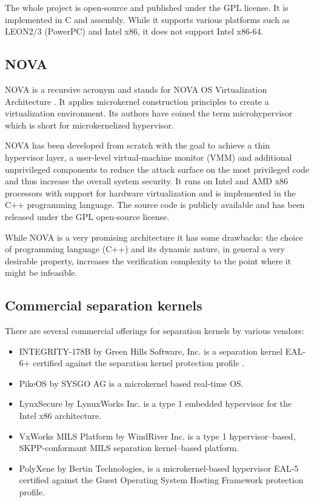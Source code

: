 The whole project is open-source and published under the GPL license. It is
implemented in C and assembly. While it supports various platforms such as
LEON2/3 (PowerPC) and Intel x86, it does not support Intel x86-64.

\subsection{NOVA}
NOVA is a recursive acronym and stands for NOVA OS Virtualization Architecture
\cite{Steinberg:2010:NMS:1755913.1755935}. It applies microkernel construction
principles to create a virtualization environment. Its authors have coined
the term microhypervisor which is short for
microkernelized hypervisor.

NOVA has been developed from scratch with the goal to achieve a thin hypervisor
layer, a user-level virtual-machine monitor (VMM) and additional unprivileged
components to reduce the attack surface on the most privileged code and thus
increase the overall system security. It runs on Intel and AMD x86 processors
with support for hardware virtualization and is implemented in the C++
programming language. The source code is publicly available \cite{NOVA} and has
been released under the GPL open-source license.

While NOVA is a very promising architecture it has some drawbacks: the choice of
programming language (C++) and its dynamic nature, in general a very desirable
property, increases the verification complexity to the point where it might be
infeasible.

\subsection{Commercial separation kernels}\label{subsec:commercial-sks}
There are several commercial offerings for separation kernels by various
vendors:

\begin{itemize}
	\item INTEGRITY-178B by Green Hills Software, Inc. is a separation kernel
		EAL-6+ certified against the separation kernel protection profile
		\cite{SKPP}.
	\item PikeOS by SYSGO AG is a microkernel based real-time OS.
	\item LynxSecure by LynuxWorks Inc. is a type 1 embedded hypervisor for the
		Intel x86 architecture.
	\item VxWorks MILS Platform by WindRiver Inc. is a type 1 hypervisor–based,
		SKPP-conformant MILS separation kernel–based platform.
	\item PolyXene by Bertin Technologies, is a microkernel-based hypervisor
		EAL-5 certified against the Guest Operating System Hosting Framework
		protection profile.
\end{itemize}

